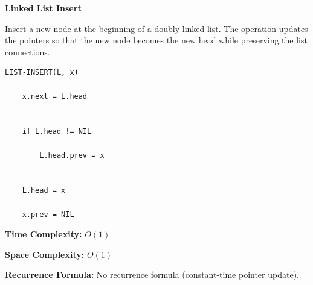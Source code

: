 \documentclass[a4paper,12pt]{article}
\begin{document}
\begin{tcolorbox}[
    colback=gray!30,
    colframe=black,
    boxrule=1pt,
    arc=0mm
]

\begin{tcolorbox}[
    colback=gray!10,
    colframe=black,
    arc=0mm
]
\centering
{\Huge\bfseries Linked List Insert}
\end{tcolorbox}


\begin{tcolorbox}[
    colback=gray!10,
    colframe=black,
    arc=0mm
]
\small
Insert a new node at the beginning of a doubly linked list.
The operation updates the pointers so that the new node becomes
the new head while preserving the list connections.
\end{tcolorbox}


\begin{tcolorbox}[
    colback=black!5,
    colframe=black,
    arc=0mm,
    title=Pseudo-code
]
\tiny
\begin{lstlisting}
LIST-INSERT(L, x)

    x.next = L.head


    if L.head != NIL

        L.head.prev = x


    L.head = x

    x.prev = NIL
\end{lstlisting}
\end{tcolorbox}


\begin{tcolorbox}[
    colback=cyan!20,
    colframe=black,
    arc=0mm
]
\small
\textbf{Time Complexity:}
$O(1)$
\end{tcolorbox}


\begin{tcolorbox}[
    colback=violet!20,
    colframe=black,
    arc=0mm
]
\small
\textbf{Space Complexity:}
$O(1)$
\end{tcolorbox}


\begin{tcolorbox}[
    colback=pink!20,
    colframe=black,
    arc=0mm
]
\small
\textbf{Recurrence Formula:}
No recurrence formula (constant-time pointer update).
\end{tcolorbox}

\end{tcolorbox}
\end{document}
